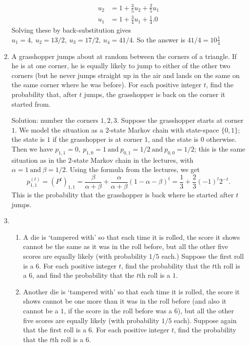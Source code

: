 \documentclass[11pt,a4paper]{report}
\begin{document}
\begin{enumerate}
\begin{align*}
            u_2 &= 1+\frac{3}{5}u_2+\frac{2}{5}u_1\\
            u_1 &= 1+\frac{3}{4}u_1+\frac{1}{4}.0
        \end{align*}
        Solving these by back-substitution gives $u_1 = 4,\ u_2 = 13/2,\ u_3 = 17/2,\ u_4 = 41/4$. So the answer is $41/4 = 10\frac{1}{4}$
        \item  A grasshopper jumps about at random between the corners of a triangle. If he is at one corner, he is equally likely to jump to either of the other two corners (but he never jumps straight up in the air and lands on the same on the same corner where he was before). For each positive integer $t$, find the probability that, after $t$ jumps, the grasshopper is back on the corner it started from.\par
        Solution: number the corners $1,2,3$. Suppose the grasshopper starts at corner $1$. We model the situation as a $2$-state Markov chain with state-space $\{0, 1\}$; the state is $1$ if the grasshopper is at corner $1$, and the state is 0 otherwise. Then we have $p_{1,1} =0,\ p_{1,0} = 1\ \text{and}\ p_{0,1} = 1/2\ \text{and}\ p_{0,0} = 1/2$; this is the same situation as in the $2$-state Markov chain in the lectures, with $\alpha = 1\ \text{and}\ \beta = 1/2$. Using the formula from the lectures, we get
        $$p^{(t)}_{1,1}=(P^t)_{1,1}=\frac{\beta}{\alpha+\beta}+\frac{\alpha}{\alpha+\beta}(1-\alpha-\beta)^t=\frac{1}{3}+\frac{2}{3}(-1)^t2^{-t}.$$
        This is the probability that the grasshopper is back where he started after $t$ jumps.
        \item 
        \begin{enumerate}
            \item A die is ‘tampered with’ so that each time it is rolled, the score it shows cannot be the same as it was in the roll before, but all the other five scores are equally likely (with probability $1/5$ each.) Suppose the first roll is a $6$. For each positive integer $t$, find the probability that the $t$th roll is a $6$, and find the probability that the $t$th roll is a $1$.
            \item Another die is ‘tampered with’ so that each time it is rolled, the score it shows cannot be one more than it was in the roll before (and also it cannot be a $1$, if the score in the roll before was a $6$), but all the other five scores are equally likely (with probability $1/5$ each). Suppose again that the first roll is a $6$. For each positive integer $t$, find the probability that the $t$th roll is a $6$.         

\end{enumerate}
\end{enumerate}
\end{document}
